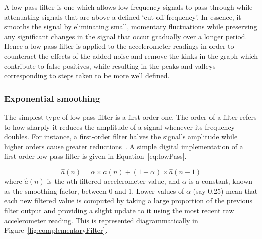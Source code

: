 \documentclass[12pt,a4paper]{report}
\begin{document}
A low-pass filter is one which allows low frequency signals to pass through while attenuating signals that are above a defined `cut-off frequency'. In essence, it smooths the signal by eliminating small, momentary fluctuations while preserving any significant changes in the signal that occur gradually over a longer period. Hence a low-pass filter is applied to the accelerometer readings in order to counteract the effects of the added noise and remove the kinks in the graph which contribute to false positives, while resulting in the peaks and valleys corresponding to steps taken to be more well defined. 

\subsubsection{Exponential smoothing}

The simplest type of low-pass filter is a first-order one. The order of a filter refers to how sharply it reduces the amplitude of a signal whenever its frequency doubles. For instance, a first-order filter halves the signal's amplitude while higher orders cause greater reductions~\cite[p.2528]{casiez20121}. A simple digital implementation of a first-order low-pass filter is given in Equation~\ref{eq:lowPass}.   

\begin{equation}\label{eq:lowPass}
\hat{a}(n) = \alpha \times a(n) + (1 - \alpha) \times \hat{a}(n-1)
\end{equation}
where $\hat{a}(n)$ is the $n$th filtered accelerometer value, and $\alpha$ is a constant, known as the smoothing factor, between 0 and 1. Lower values of $\alpha$ (say 0.25) mean that each new filtered value is computed by taking a large proportion of the previous filter output and providing a slight update to it using the most recent raw accelerometer reading. This is represented diagrammatically in Figure~\ref{fig:complementaryFilter}.  
\end{document}
